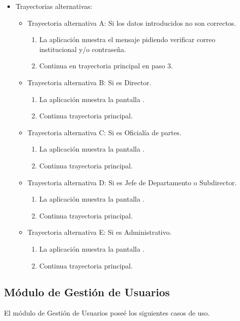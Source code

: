 \begin{itemize}
\begin{enumerate}
		\end{enumerate}
	\item Trayectorias alternativas:
		\begin{itemize}
			\item Trayectoria alternativa A: Si los datos introducidos no son correctos.
				\begin{enumerate}
					\item La aplicación muestra el mensaje  pidiendo verificar correo institucional y/o contraseña.
					\item Continua en trayectoria principal en paso 3.
				\end{enumerate}
			\item Trayectoria alternativa B: Si es Director.
				\begin{enumerate}
					\item La aplicación muestra la pantalla .
					\item Continua trayectoria principal.
				\end{enumerate}
			\item Trayectoria alternativa C: Si es Oficialía de partes.
				\begin{enumerate}
					\item La aplicación muestra la pantalla .
					\item Continua trayectoria principal.
				\end{enumerate}
			\item Trayectoria alternativa D: Si es Jefe de Departamento o Subdirector.
				\begin{enumerate}
					\item La aplicación muestra la pantalla .
					\item Continua trayectoria principal.
				\end{enumerate}
			\item Trayectoria alternativa E: Si es Administrativo.
				\begin{enumerate}
					\item La aplicación muestra la pantalla .
					\item Continua trayectoria principal.
				\end{enumerate}
		\end{itemize}
\end{itemize}

\newpage

	\subsection{Módulo de Gestión de Usuarios}
	El módulo de Gestión de Usuarios poseé los siguientes casos de uso.
	
